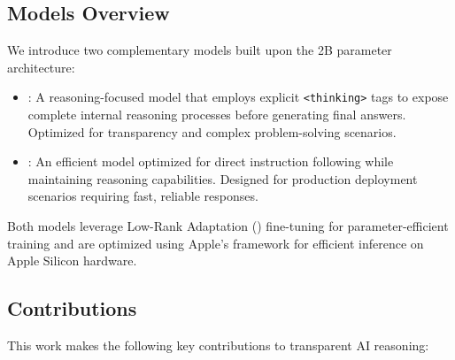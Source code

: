 \subsection{Models Overview}

We introduce two complementary models built upon the \qwen{} 2B parameter architecture:

\begin{itemize}
    \item \textbf{\supra{}}: A reasoning-focused model that employs explicit \texttt{<thinking>} tags to expose complete internal reasoning processes before generating final answers. Optimized for transparency and complex problem-solving scenarios.
    
    \item \textbf{\zennano{}}: An efficient model optimized for direct instruction following while maintaining reasoning capabilities. Designed for production deployment scenarios requiring fast, reliable responses.
\end{itemize}

Both models leverage Low-Rank Adaptation (\lora{}) fine-tuning \cite{hu2021lora} for parameter-efficient training and are optimized using Apple's \mlx{} framework for efficient inference on Apple Silicon hardware.

\subsection{Contributions}

This work makes the following key contributions to transparent AI reasoning:

